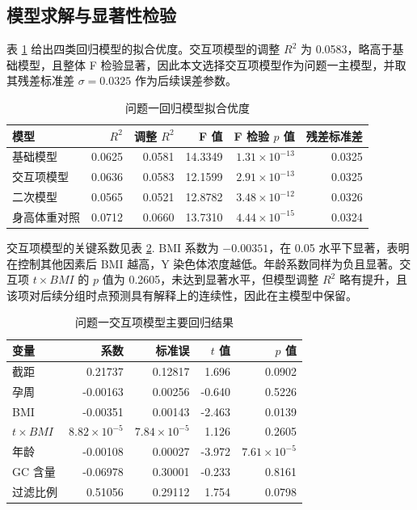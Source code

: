 \documentclass[UTF8,zihao=-4]{ctexart}
\numberwithin{equation}{section}
\begin{document}
\subsection{模型求解与显著性检验}

表 \ref{tab:q1goodness} 给出四类回归模型的拟合优度。交互项模型的调整 $R^2$ 为 0.0583，略高于基础模型，且整体 F 检验显著，因此本文选择交互项模型作为问题一主模型，并取其残差标准差 $\sigma=0.0325$ 作为后续误差参数。

\begin{table}[H]
\centering
\caption{问题一回归模型拟合优度}
\label{tab:q1goodness}
\begin{tabular}{lrrrrr}
\toprule
模型 & $R^2$ & 调整 $R^2$ & F 值 & F 检验 $p$ 值 & 残差标准差 \\
\midrule
基础模型 & 0.0625 & 0.0581 & 14.3349 & $1.31\times10^{-13}$ & 0.0325 \\
交互项模型 & 0.0636 & 0.0583 & 12.1599 & $2.91\times10^{-13}$ & 0.0325 \\
二次模型 & 0.0565 & 0.0521 & 12.8782 & $3.48\times10^{-12}$ & 0.0326 \\
身高体重对照 & 0.0712 & 0.0660 & 13.7310 & $4.44\times10^{-15}$ & 0.0324 \\
\bottomrule
\end{tabular}
\end{table}

交互项模型的关键系数见表 \ref{tab:q1reg}. BMI 系数为 $-0.00351$，在 0.05 水平下显著，表明在控制其他因素后 BMI 越高，Y 染色体浓度越低。年龄系数同样为负且显著。交互项 $t\times BMI$ 的 $p$ 值为 0.2605，未达到显著水平，但模型调整 $R^2$ 略有提升，且该项对后续分组时点预测具有解释上的连续性，因此在主模型中保留。

\begin{table}[H]
\centering
\caption{问题一交互项模型主要回归结果}
\label{tab:q1reg}
\begin{tabular}{lrrrr}
\toprule
变量 & 系数 & 标准误 & $t$ 值 & $p$ 值 \\
\midrule
截距 & 0.21737 & 0.12817 & 1.696 & 0.0902 \\
孕周 & -0.00163 & 0.00256 & -0.640 & 0.5226 \\
BMI & -0.00351 & 0.00143 & -2.463 & 0.0139 \\
$t\times BMI$ & $8.82\times10^{-5}$ & $7.84\times10^{-5}$ & 1.126 & 0.2605 \\
年龄 & -0.00108 & 0.00027 & -3.972 & $7.61\times10^{-5}$ \\
GC 含量 & -0.06978 & 0.30001 & -0.233 & 0.8161 \\
过滤比例 & 0.51056 & 0.29112 & 1.754 & 0.0798 \\
\bottomrule
\end{tabular}
\end{table}
\end{document}
